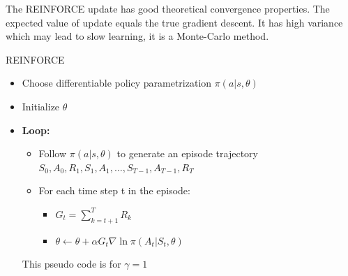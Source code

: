 The REINFORCE update has good theoretical convergence properties. The expected value of update equals the true gradient descent. It has high variance which may lead to slow learning, it is a Monte-Carlo method.

\begin{wbox}{REINFORCE}


\begin{itemize}
	\item Choose differentiable policy parametrization $\pi (a|s,\theta)$
	\item Initialize $\theta$
	\item \textbf{Loop:}
	\begin{itemize}
	 	\item Follow $\pi (a|s,\theta)$ to generate an episode trajectory $S_0,A_0,R_1,S_1,A_1,\ldots,S_{T-1},A_{T-1},R_T$
	 	\item For each time step t in the episode:
	 	\begin{itemize}
	 		\item $G_t = \sum_{k=t+1}^{T}R_k$
	 		\item $\theta \leftarrow \theta + \alpha G_t \nabla \ln \pi (A_t|S_t,\theta)$
	 	\end{itemize}
	 \end{itemize} 
This pseudo code is for $\gamma = 1$
\end{itemize}


\end{wbox}
